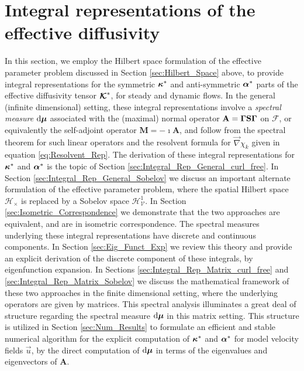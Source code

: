 \documentclass[11pt]{amsart}
\renewcommand{\d}{\mathrm{d}}
\newcommand{\Mb}{\mathbf{M}}
\newcommand{\Sb}{\mathbf{S}}
\newcommand{\Ab}{\mathbf{A}}
\newcommand\Kbc{\mbox{\boldmath${\mathcal{K}}$}}
\newcommand{\Vc}{\mathcal{V}}
\newcommand{\Hc}{\mathcal{H}}
\newcommand{\Hs}{\mathscr{H}}
\newcommand{\Fs}{\mathscr{F}}
\newcommand\bmu{\mbox{\boldmath${\mu}$}}
\newcommand\balpha{\mbox{\boldmath${\alpha}$}}
\newcommand\bkappa{\mbox{\boldmath${\kappa}$}}
\newcommand\bGamma{\mbox{\boldmath${\Gamma}$}}
\begin{document}
\section{Integral representations of the effective
  diffusivity} \label{sec:Integral_Rep} 
%
In this section, we employ the Hilbert space formulation of the
effective parameter problem discussed in Section
\ref{sec:Hilbert_Space} above, to provide integral representations for the
symmetric $\bkappa^*$ and anti-symmetric $\balpha^*$ parts of the
effective diffusivity tensor $\Kbc^*$, for steady and dynamic
flows. In the general (infinite dimensional) setting, these integral
representations involve a \emph{spectral measure} $\d\bmu$ associated
with the (maximal) normal operator $\Ab=\bGamma\Sb\bGamma$ on $\Fs$,
or equivalently the self-adjoint operator $\Mb=-\imath\Ab$, and follow from
the spectral theorem for such linear operators
\cite{Reed-1980,Stone:64} and the resolvent formula for $\vec{\nabla}\chi_k$
given in equation \eqref{eq:Resolvent_Rep}. The derivation of these
integral representations for $\bkappa^*$ and $\balpha^*$ is the topic
of Section \ref{sec:Integral_Rep_General_curl_free}. In Section
\ref{sec:Integral_Rep_General_Sobelov} we discuss an important
alternate formulation of the effective parameter problem, where the
spatial Hilbert space $\Hs_\times$ is replaced by a Sobelov space
$\Hc^1_{\Vc}$. In Section \ref{sec:Isometric_Correspondence} we
demonstrate that the two approaches are equivalent, and are in
isometric correspondence. The spectral measures underlying these
integral representations have discrete and continuous components. In
Section \ref{sec:Eig_Funct_Exp} we review this theory and provide an
explicit derivation of the discrete component of these integrals, by
eigenfunction expansion. In Sections
\ref{sec:Integral_Rep_Matrix_curl_free} and
\ref{sec:Integral_Rep_Matrix_Sobelov} we discuss the mathematical
framework of these two approaches in the finite dimensional setting, 
where the underlying operators are given by matrices. This spectral
analysis illuminates a great deal of structure regarding the spectral
measure $\d\bmu$ in this matrix setting. This structure is utilized in
Section \ref{sec:Num_Results} to formulate an efficient and stable
numerical algorithm for the explicit computation of $\bkappa^*$ and
$\balpha^*$ for model velocity fields $\vec{u}$, by the direct
computation of $\d\bmu$ in terms of the eigenvalues and eigenvectors
of $\Ab$.    
\end{document}
